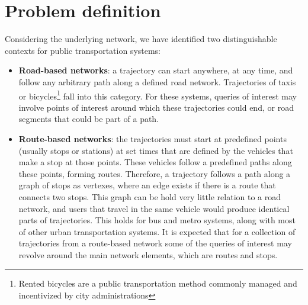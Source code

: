 \documentclass[a4paper,10pt,twoside]{book}
\begin{document}
	\section{Problem definition}
	\label{sec:pd}
	Considering the underlying network, we have identified two distinguishable contexts for public transportation systems:
	\begin{itemize}
	    \item \textbf{Road-based networks}: a trajectory can start anywhere, at any time, and follow any arbitrary path along a defined road network.
	    Trajectories of taxis or bicycles\footnote{Rented bicycles are a public transportation method commonly managed and incentivized by city administrations} fall into this category. For these systems, queries of interest may involve points of interest around which these trajectories could end, or road segments that could be part of a path.
	    \item \textbf{Route-based networks}: the trajectories must start at predefined points (usually stops or stations) at set times that are defined by the vehicles that make a stop at those points. These vehicles follow a predefined paths along these points, forming routes. Therefore, a trajectory follows a path along a graph of stops as vertexes, where an edge exists if there is a route that connects two stops. This graph can be hold very little relation to a road network, and users that travel in the same vehicle would produce identical parts of trajectories. This holds for bus and metro systems, along with most of other urban transportation systems. It is expected that for a collection of trajectories from a route-based network some of the queries of interest may revolve around the main network elements, which are routes and stops.
	\end{itemize}
	
\end{document}
